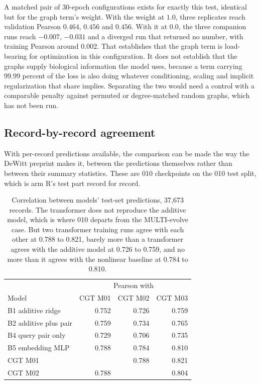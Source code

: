 A matched pair of 30-epoch configurations exists for exactly this test, identical
but for the graph term's weight. With the weight at $1.0$, three replicates reach
validation Pearson $0.464$, $0.456$ and $0.456$. With it at $0.0$, the three
companion runs reach $-0.007$, $-0.031$ and a diverged run that returned no
number, with training Pearson around $0.002$. That establishes that the graph term
is load-bearing for optimization in this configuration. It does not establish that
the graphs supply biological information the model uses, because a term carrying
99.99 percent of the loss is also doing whatever conditioning, scaling and implicit
regularization that share implies. Separating the two would need a control with a
comparable penalty against permuted or degree-matched random graphs, which has not
been run.

\subsection{Record-by-record agreement}
\label{sec:paired}

With per-record predictions available, the comparison can be made the way the
DeWitt preprint makes it, between the predictions themselves rather than between
their summary statistics. These are 010 checkpoints on the 010 test split, which is
arm R's test part record for record.

\begin{table}[htbp]
\centering
\footnotesize
\caption{Correlation between models' test-set predictions, 37{,}673 records. The
transformer does not reproduce the additive model, which is where 010 departs from
the MULTI-evolve case. But two transformer training runs agree with each other at
0.788 to 0.821, barely more than a transformer agrees with the additive model at
0.726 to 0.759, and no more than it agrees with the nonlinear baseline at 0.784 to
0.810.}
\label{tab:paired}
\begin{tabular}{lrrr}
\toprule
& \multicolumn{3}{c}{Pearson with} \\
Model & CGT M01 & CGT M02 & CGT M03 \\
\midrule
B1 additive ridge & 0.752 & 0.726 & 0.759 \\
B2 additive plus pair & 0.759 & 0.734 & 0.765 \\
B4 query pair only & 0.729 & 0.706 & 0.735 \\
B5 embedding MLP & 0.788 & 0.784 & 0.810 \\
CGT M01 & & 0.788 & 0.821 \\
CGT M02 & 0.788 & & 0.804 \\
\bottomrule
\end{tabular}
\end{table}

